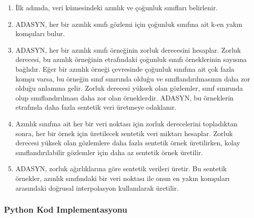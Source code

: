 \begin{enumerate}
    \item İlk adımda, veri kümesindeki azınlık ve çoğunluk sınıfları belirlenir.
    \item ADASYN, her bir azınlık sınıfı gözlemi için çoğunluk sınıfına ait k-en yakın komşuları bulur.
    \item ADASYN, her bir azınlık sınıfı örneğinin zorluk derecesini hesaplar. Zorluk derecesi, bu azınlık örneğinin etrafındaki çoğunluk sınıfı örneklerinin sayısına bağlıdır. Eğer bir azınlık örneği çevresinde çoğunluk sınıfına ait çok fazla komşu varsa, bu örneğin sınıf sınırında olduğu ve sınıflandırılmasının daha zor olduğu anlamına gelir. Zorluk derecesi yüksek olan gözlemler, sınıf sınırında olup sınıflandırılması daha zor olan örneklerdir. ADASYN, bu örneklerin etrafında daha fazla sentetik veri üretmeye odaklanır.
    \item Azınlık sınıfına ait her bir veri noktası için zorluk derecelerini topladıktan sonra, her bir örnek için üretilecek sentetik veri miktarı hesaplar. Zorluk derecesi yüksek olan gözlemlere daha fazla sentetik örnek üretilirken, kolay sınıflandırılabilir gözlemler için daha az sentetik örnek üretilir.
    \item ADASYN, zorluk ağırlıklarına göre sentetik verileri üretir. Bu sentetik örnekler, azınlık sınıfındaki bir veri noktası ile onun en yakın komşuları arasındaki doğrusal interpolasyon kullanılarak üretilir.
\end{enumerate}

\subsubsection{Python Kod Implementasyonu}

